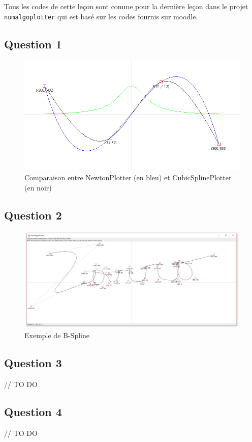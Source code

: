 Tous les codes de cette leçon sont comme pour la dernière leçon dans le projet \texttt{numalgoplotter} qui est basé sur les codes fournis sur moodle. 

\subsection{Question 1}

\begin{figure}[H]
	\centering
	\caption{\label{comparaison} Comparaison entre NewtonPlotter (en bleu) et CubicSplinePlotter (en noir)}
	\includegraphics[scale = 0.4]{Figures/7_comparaisonNewtonCubic.png}
\end{figure}

\subsection{Question 2}


\begin{figure}[H]
	\caption{\label{7_zorro} Exemple de B-Spline}
	\centering
	\includegraphics[scale = 0.3]{Figures/7_zorro.png}
\end{figure}

\subsection{Question 3}

// TO DO


\subsection{Question 4}

// TO DO